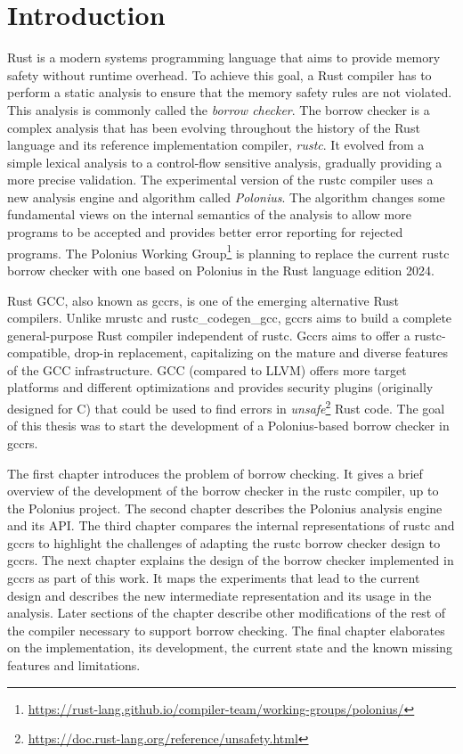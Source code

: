 \documentclass[
  11pt,
  twoside,symmetric]{report}
\DeclareRobustCommand{\href}[2]{#2\footnote{\url{#1}}}
\begin{document}
\chapter{Introduction}\label{sec:introduction}

Rust is a modern systems programming language that aims to provide
memory safety without runtime
overhead. To achieve this goal, a
Rust compiler has to perform a static analysis to ensure that the memory
safety rules are not violated. This analysis is commonly called the
\emph{borrow checker}. The borrow checker is a complex analysis that has
been evolving throughout the history of the Rust language and its
reference implementation compiler, \emph{rustc}. It evolved from a
simple lexical analysis to a control-flow sensitive analysis, gradually
providing a more precise validation. The experimental version of the
rustc compiler uses a new analysis engine and algorithm called
\emph{Polonius}. The algorithm changes some fundamental views on the
internal semantics of the analysis to allow more programs to be accepted
and provides better error reporting for rejected
programs. The
\href{https://rust-lang.github.io/compiler-team/working-groups/polonius/}{Polonius
Working Group} is planning to replace the current rustc borrow checker
with one based on Polonius in the Rust language edition
2024.

Rust GCC, also known as gccrs, is one of the emerging alternative Rust
compilers. Unlike mrustc and rustc\_codegen\_gcc, gccrs aims to build a
complete general-purpose Rust compiler independent of rustc. Gccrs aims
to offer a rustc-compatible, drop-in replacement, capitalizing on the
mature and diverse features of the GCC infrastructure. GCC (compared to
LLVM) offers more target platforms and different optimizations and
provides security plugins (originally designed for C) that could be used
to find errors in
\href{https://doc.rust-lang.org/reference/unsafety.html}{\emph{unsafe}}
Rust code. The goal of this thesis was
to start the development of a Polonius-based borrow checker in gccrs.

The first chapter introduces the problem of borrow checking. It gives a
brief overview of the development of the borrow checker in the rustc
compiler, up to the Polonius project. The second chapter describes the
Polonius analysis engine and its API. The third chapter compares the
internal representations of rustc and gccrs to highlight the challenges
of adapting the rustc borrow checker design to gccrs. The next chapter
explains the design of the borrow checker implemented in gccrs as part
of this work. It maps the experiments that lead to the current design
and describes the new intermediate representation and its usage in the
analysis. Later sections of the chapter describe other modifications of
the rest of the compiler necessary to support borrow checking. The final
chapter elaborates on the implementation, its development, the current
state and the known missing features and limitations.
\end{document}
